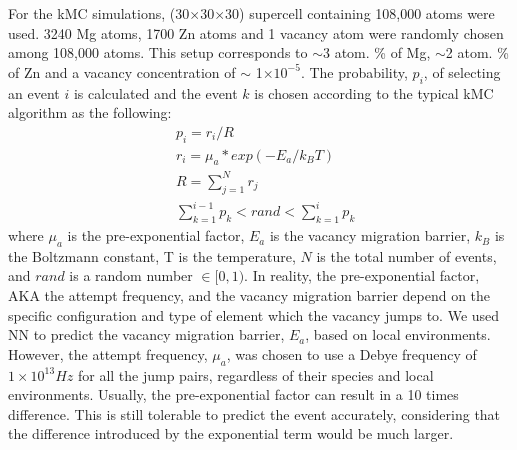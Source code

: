 For the \ac{kMC} simulations, (30$\times$30$\times$30) supercell containing 108,000 atoms were used. 3240 Mg atoms, 1700 Zn atoms and 1 vacancy atom were randomly chosen among 108,000 atoms. This setup corresponds to $\sim$3 atom. \% of Mg, $\sim$2 atom. \% of Zn and a vacancy concentration of $\sim$ 1$\times10^{-5}$. The probability, $p_i$, of selecting an event $i$ is calculated and the event $k$ is chosen according to the typical \ac{kMC} algorithm as the following:
\begin{subequations}
\begin{align}
& p_i = r_i / R    \label{Chap:Al/Vac:eq:prob} \\
& r_i = \mu_a * exp(- E_a / k_B T)  \label{Chap:Al/Vac:eq:rate} \\
& R = \sum_{j=1}^N r_j \label{Chap:Al/Vac:eq:R} \\
& \sum_{k=1}^{i-1} p_k < rand < \sum_{k=1}^{i} p_k \label{Chap:Al/Vac:eq:choice}
\end{align}
\end{subequations}
where $\mu_a$ is the pre-exponential factor, $E_a$ is the vacancy migration barrier, $k_B$ is the Boltzmann constant, T is the temperature, $N$ is the total number of events, and $rand$ is a random number $\in [0, 1)$. In reality, the pre-exponential factor, AKA the attempt frequency, and the vacancy migration barrier depend on the specific configuration \cite{osti_323431,van2001first,le2002kinetic} and type of element which the vacancy jumps to\cite{clouet2004nucleation}. We used \ac{NN} to predict the vacancy migration barrier, $E_a$, based on local environments. However, the attempt frequency, $\mu_a$, was chosen to use a Debye frequency of $1\times10^{13} Hz$ for all the jump pairs, regardless of their species and local environments. Usually, the pre-exponential factor can result in a 10 times difference\cite{sha2005kinetic}. This is still tolerable to predict the event accurately, considering that the difference introduced by the exponential term would be much larger.


